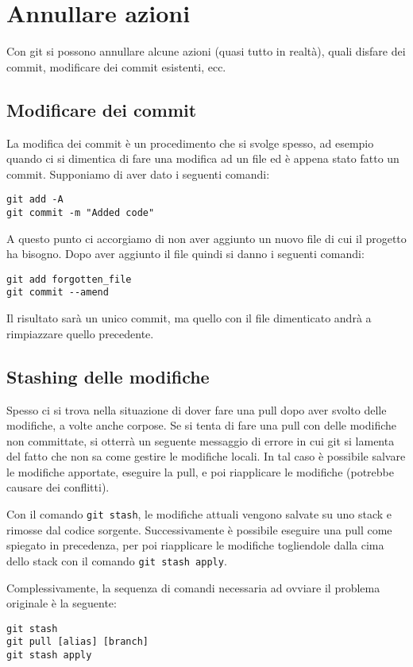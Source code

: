 \documentclass[a4paper, 11pt]{article}
\begin{document}
	\section{Annullare azioni}
	Con git si possono annullare alcune azioni (quasi tutto in realtà), quali disfare dei commit, modificare dei commit esistenti, ecc.
	
	\subsection{Modificare dei commit}
	La modifica dei commit è un procedimento che si svolge spesso, ad esempio quando ci si dimentica di fare una modifica ad un file ed è appena stato fatto un commit. Supponiamo di aver dato i seguenti comandi: \begin{lstlisting}
git add -A
git commit -m "Added code"
	\end{lstlisting}
	
	A questo punto ci accorgiamo di non aver aggiunto un nuovo file di cui il progetto ha bisogno. Dopo aver aggiunto il file quindi si danno i seguenti comandi: \begin{lstlisting}
git add forgotten_file
git commit --amend
	\end{lstlisting}
	
	Il risultato sarà un unico commit, ma quello con il file dimenticato andrà a rimpiazzare quello precedente.
	
	\subsection{Stashing delle modifiche}
	Spesso ci si trova nella situazione di dover fare una pull dopo aver svolto delle modifiche, a volte anche corpose. Se si tenta di fare una pull con delle modifiche non committate, si otterrà un seguente messaggio di errore in cui git si lamenta del fatto che non sa come gestire le modifiche locali. In tal caso è possibile salvare le modifiche apportate, eseguire la pull, e poi riapplicare le modifiche (potrebbe causare dei conflitti).
	
	Con il comando \lstinline|git stash|, le modifiche attuali vengono salvate su uno stack e rimosse dal codice sorgente. Successivamente è possibile eseguire una pull come spiegato in precedenza, per poi riapplicare le modifiche togliendole dalla cima dello stack con il comando \lstinline|git stash apply|.
	
	Complessivamente, la sequenza di comandi necessaria ad ovviare il problema originale è la seguente:
	\begin{lstlisting}
git stash
git pull [alias] [branch]
git stash apply
	\end{lstlisting}
	\newpage
	\appendix
	\renewcommand{\arraystretch}{1.1}
		
\end{document}

